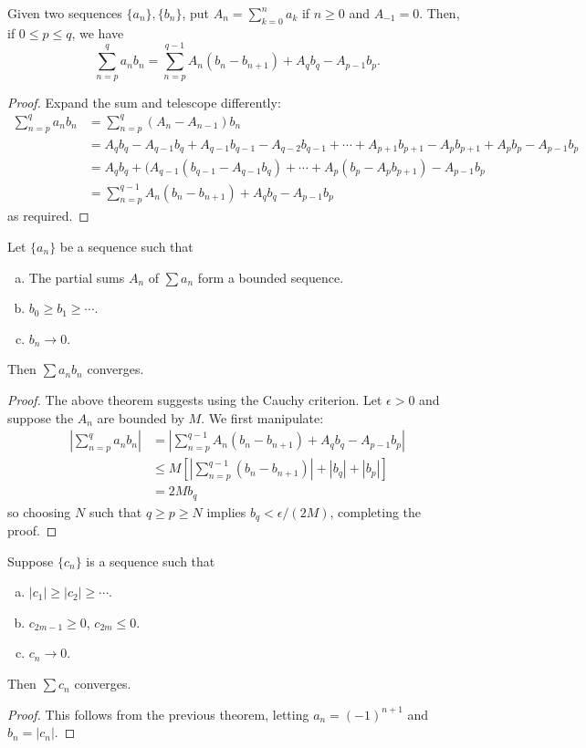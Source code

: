 \begin{theorem}
Given two sequences $\{a_n\}, \{b_n\}$, put $A_n = \sum_{k=0}^{n} a_k$ if $n \ge 0$ and $A_{-1} = 0$. Then, if $0 \le p \le q$, we have
\[
	\sum_{n=p}^{q} a_nb_n = \sum_{n=p}^{q-1} A_n(b_n - b_{n+1}) + A_qb_q - A_{p-1}b_p.
\]

\begin{proof}
Expand the sum and telescope differently:
\begin{align*}
\sum_{n=p}^{q} a_nb_n &= \sum_{n=p}^{q} (A_n - A_{n-1})b_n \\
	&= A_qb_q - A_{q-1}b_q + A_{q-1}b_{q-1} - A_{q-2}b_{q-1} + \dotsb + A_{p+1}b_{p+1} - A_pb_{p+1} + A_pb_p - A_{p-1}b_p \\
	&= A_qb_q + (A_{q-1}(b_{q-1} - A_{q-1}b_q) + \dotsb + A_p(b_p - A_pb_{p+1}) - A_{p-1}b_p \\
	&= \sum_{n=p}^{q-1} A_n(b_n - b_{n+1}) + A_qb_q - A_{p-1}b_p
\end{align*}
as required.
\end{proof}
\end{theorem}

\begin{theorem} %
Let $\{a_n\}$ be a sequence such that
\begin{enumerate}[(a)]
\item The partial sums $A_n$ of $\sum a_n$ form a bounded sequence.
\item $b_0 \ge b_1 \ge \dotsb$.
\item $b_n \to 0$.
\end{enumerate}
Then $\sum a_nb_n$ converges.

\begin{proof}
The above theorem suggests using the Cauchy criterion. Let $\epsilon > 0$ and suppose the $A_n$ are bounded by $M$. We first manipulate:
\begin{align*}
\left|\sum_{n=p}^{q} a_nb_n \right| &= \left|\sum_{n=p}^{q-1} A_n(b_n - b_{n+1}) + A_qb_q - A_{p-1}b_p\right| \\
	&\le M \left[\left|\sum_{n=p}^{q-1} (b_n - b_{n+1})\right| + |b_q| + |b_p|\right] \\
	&= 2Mb_q
\end{align*}
so choosing $N$ such that $q \ge p \ge N$ implies $b_q < \epsilon/(2M)$, completing the proof.
\end{proof}
\end{theorem}

\begin{theorem} %
Suppose $\{c_n\}$ is a sequence such that
\begin{enumerate}[(a)]
\item $|c_1| \ge |c_2| \ge \dotsb$.
\item $c_{2m-1} \ge 0$, $c_{2m} \le 0$.
\item $c_n \to 0$.
\end{enumerate}
Then $\sum c_n$ converges.

\begin{proof}
This follows from the previous theorem, letting $a_n = (-1)^{n+1}$ and $b_n = |c_n|$. 
\end{proof}
\end{theorem}

